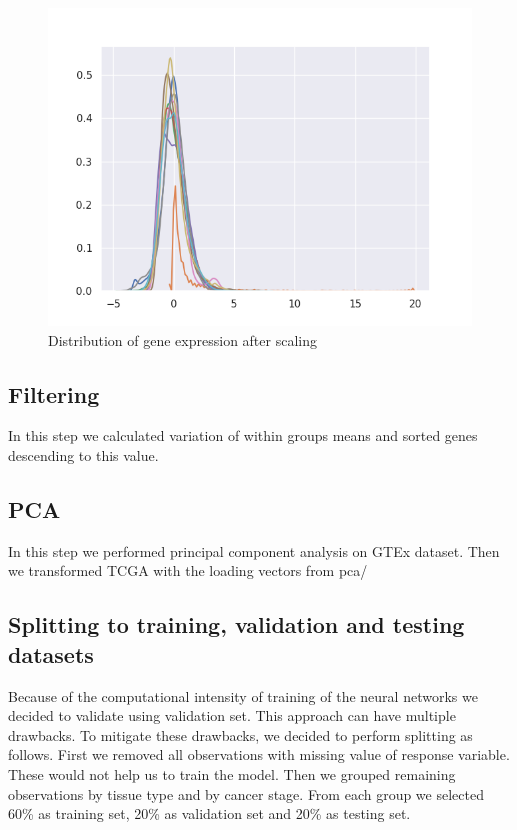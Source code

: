 \begin{figure}
    \centering
    \includegraphics[width=\linewidth]{images/scaled_expr_genes.png}
    \caption{Distribution of gene expression after scaling}
    \label{fig:scaled_expr_genes}
\end{figure}


\subsection{Filtering}
In this step we calculated variation of within groups means and sorted genes descending to this value.

\subsection{PCA}
In this step we performed principal component analysis on GTEx dataset.
Then we transformed TCGA with the loading vectors from pca/

\subsection{Splitting to training, validation and testing datasets}
Because of the computational intensity of training of the neural networks we decided to validate using validation set. 
This approach can have multiple drawbacks.
To mitigate these drawbacks, we decided to perform splitting as follows.
First we removed all observations with missing value of response variable.
These would not help us to train the model.
Then we grouped remaining observations by tissue type and by cancer stage.
From each group we selected 60\% as training set, 20\% as validation set and 20\% as testing set.

